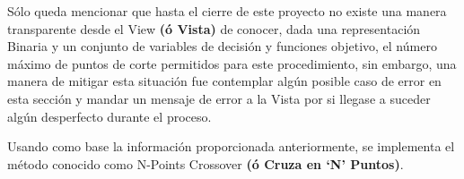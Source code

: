 \documentclass[letterpaper,10pt,english]{sphinxmanual}
\begin{document}
\begin{DUlineblock}{0em}
\item[] Sólo queda mencionar que hasta el cierre de este proyecto no existe una manera
transparente desde el View \textbf{(ó Vista)} de conocer, dada una representación Binaria
y un conjunto de variables de decisión y funciones objetivo, el número máximo de puntos
de corte permitidos para este procedimiento, sin embargo, una manera de mitigar esta situación
fue contemplar algún posible caso de error en esta sección y mandar un mensaje de error a la Vista
por si llegase a suceder algún desperfecto durante el proceso.
\end{DUlineblock}
\label{Model/Operator/Crossover/NPointsCrossover:module-Model.Operator.Crossover.NPointsCrossover}

\begin{fulllineitems}
\label{Model/Operator/Crossover/NPointsCrossover:Model.Operator.Crossover.NPointsCrossover.execute_crossover_technique}
Usando como base la información proporcionada anteriormente, se implementa
el método conocido como N-Points Crossover \textbf{(ó Cruza en `N' Puntos)}.

\end{fulllineitems}
\end{document}
